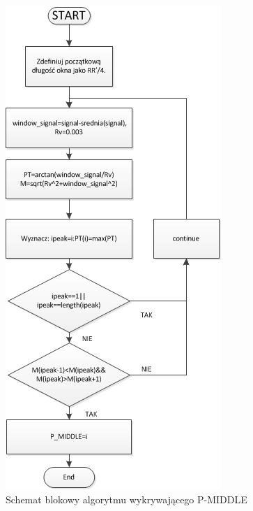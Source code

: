 \begin{figure}[h!]
\centering
\includegraphics[scale=0.8] {Waves/img/schemat_Pmiddle.jpg}
\caption{Schemat blokowy algorytmu wykrywającego P-MIDDLE  }
\label{fig:Waves_SchemPMid}
\end{figure}

